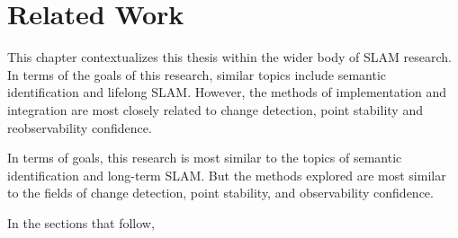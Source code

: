 \section{Related Work}
\label{sec:related_work}

This chapter contextualizes this thesis within the wider body of SLAM research. In terms of the goals of this research, similar topics include semantic identification and lifelong SLAM. However, the methods of implementation and integration are most closely related to change detection, point stability and reobservability confidence.

In terms of goals, this research is most similar to the topics of semantic identification and long-term SLAM. But the methods explored are most similar to the fields of change detection, point stability, and observability confidence.

In the sections that follow,
% 